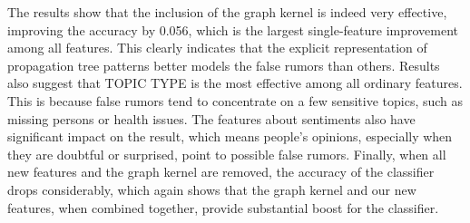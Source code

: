 The results show that the inclusion of the graph kernel is indeed
very effective, improving the accuracy by 0.056, which is the largest
single-feature improvement among all features.
This clearly indicates that the explicit representation
of propagation tree patterns better models the false rumors than others.
Results also suggest that TOPIC TYPE is the most effective among all
ordinary features. This is because false rumors tend to concentrate on a few
sensitive topics, such as missing persons or health issues.
The features about sentiments also have significant impact on the
result, which means people's opinions, especially when they are doubtful or
surprised, point to possible false rumors. Finally, when all new features
and the graph kernel are removed, the accuracy of the classifier
drops considerably, which again shows that the graph kernel and
our new features, when combined together, provide substantial boost 
for the classifier.
